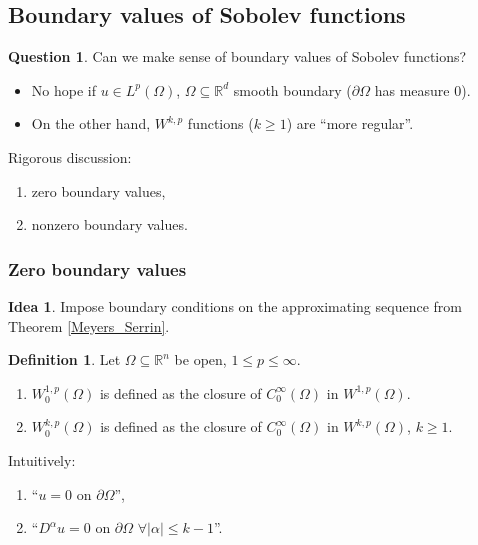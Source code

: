 \documentclass[12pt]{article}
\theoremstyle{definition}
\newtheorem*{definition*}{Definition}
\newtheorem*{idea}{Idea}
\newtheorem*{question}{Question}
\begin{document}
\subsection{Boundary values of Sobolev functions}
\begin{question}
Can we make sense of boundary values of Sobolev functions?
\end{question}

\begin{itemize}
\item No hope if $u\in L^p(\Omega)$, $\Omega\subseteq\mathbb R^d$ smooth boundary ($\partial\Omega$ has measure $0$).

\item On the other hand, $W^{k,p}$ functions ($k\geq1$) are ``more regular''.
\end{itemize}

Rigorous discussion:
\begin{enumerate}[label=\alph*)]
\item zero boundary values,
\item nonzero boundary values.
\end{enumerate}

\subsubsection{Zero boundary values}
\begin{idea}
Impose boundary conditions on the approximating sequence from Theorem \ref{Meyers_Serrin}.
\end{idea}

\begin{definition*}
Let $\Omega\subseteq\mathbb R^n$ be open, $1\leq p\leq\infty$.

\begin{enumerate}[label=(\roman*)]
\item $W_0^{1,p}(\Omega)$ is defined as the closure of $C_0^\infty(\Omega)$ in $W^{1,p}(\Omega)$.

\item $W_0^{k,p}(\Omega)$ is defined as the closure of $C_0^\infty(\Omega)$ in $W^{k,p}(\Omega)$, $k\geq1$.
\end{enumerate}
\end{definition*}

Intuitively:
\begin{enumerate}[label=(\roman*)]
\item ``$u=0$ on $\partial\Omega$'',
\item ``$D^\alpha u=0$ on $\partial\Omega$ $\forall|\alpha|\leq k-1$''.
\end{enumerate}
\end{document}
